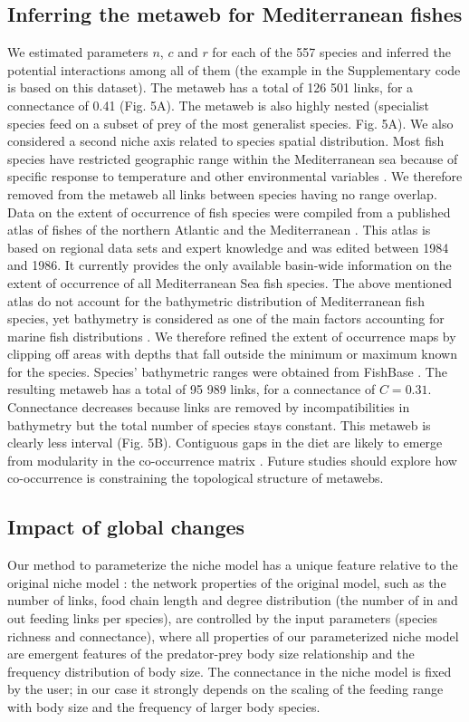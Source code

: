 \documentclass[12pt]{article}
\begin{document}
\subsection{Inferring the metaweb for Mediterranean fishes}
We estimated parameters $n$, $c$ and $r$ for each of the 557 species and
inferred the potential interactions among all of them (the example in the
Supplementary code is based on this dataset). The metaweb has a total of 126
501 links, for a connectance of 0.41 (Fig. 5A). The metaweb is also highly
nested (specialist species feed on a subset of prey of the most generalist
species. Fig. 5A). We also considered a second niche axis related to species
spatial distribution. Most fish species have restricted geographic range within
the Mediterranean sea because of specific response to temperature and other
environmental variables \parencite{Albouy2012}. We therefore removed from the
metaweb all links between species having no range overlap. Data on the extent of
occurrence of fish species were compiled from a published atlas of fishes of the
northern Atlantic and the Mediterranean \parencite{Whitehead1986}. This atlas is
based on regional data sets and expert knowledge and was edited between 1984 and
1986. It currently provides the only available basin-wide information on the
extent of occurrence of all Mediterranean Sea fish species. The above mentioned
atlas do not account for the bathymetric distribution of Mediterranean fish
species, yet bathymetry is considered as one of the main factors accounting for
marine fish distributions \parencite{Louisy2005}. We therefore refined the
extent of occurrence maps by clipping off areas with depths that fall outside
the minimum or maximum known for the species. Species' bathymetric ranges were
obtained from FishBase \parencite{Froese2011, Louisy2005}. The resulting metaweb
has a total of 95 989 links, for a connectance of $C = 0.31$. Connectance
decreases because links are removed by incompatibilities in bathymetry but the
total number of species stays constant. This metaweb is clearly less interval
(Fig. 5B). Contiguous gaps in the diet are likely to emerge from modularity in
the co-occurrence matrix \parencite{Araujo2011}. Future studies should explore
how co-occurrence is constraining the topological structure of metawebs.

\subsection{Impact of global changes}
Our method to parameterize the niche model has a unique feature relative to the
original niche model \parencite{Williams2000}: the network properties of the
original model, such as the number of links, food chain length and degree
distribution (the number of in and out feeding links per species), are
controlled by the input parameters (species richness and connectance), where
all properties of our parameterized niche model are emergent features of the
predator-prey body size relationship and the frequency distribution of body
size. The connectance in the niche model is fixed by the user; in our case it
strongly depends on the scaling of the feeding range with body size and the
frequency of larger body species.
\end{document}
